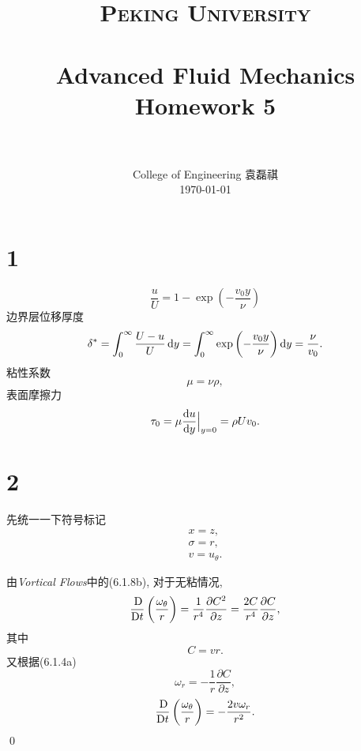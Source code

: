 \documentclass[12pt]{article}
\title{
		\vspace{-1in} 	
		\usefont{OT1}{bch}{b}{n}
		\normalfont \normalsize \textsc{\LARGE Peking University}\\[1cm] %
		\horrule{0.5pt} \\[0.5cm]
		\huge \bfseries{Advanced Fluid Mechanics Homework 5} \\
		\horrule{2pt} \\[0.5cm]
}
\author{
		\normalfont 								\normalsize
		College of Engineering \quad 2001111690  \quad 袁磊祺\\	\normalsize
        \today
}
\date{}
\begin{document}


\maketitle

\section{1}

\begin{equation}
	\frac{u}{U}=1-\exp \left(-\frac{v_{0} y}{\nu}\right)
\end{equation}
边界层位移厚度
\begin{equation}
	\delta^* = \int^{\infty}_0 \frac{U-u}{U} \dif y = \int^{\infty}_0 \exp \left(-\frac{v_{0} y}{\nu}\right) \dif y = \frac{\nu}{v_{0}}.
\end{equation}
粘性系数
\begin{equation}
	\mu = \nu \rho,
\end{equation}
表面摩擦力
\begin{equation}
	\tau_0 = \mu  \frac{\dif u}{\dif y}\Big|_{y=0} = \rho U v_0.
\end{equation}



\section{2}

先统一一下符号标记
\begin{gather}
	x = z,\\
	\sigma = r,\\
	v = u_\theta.
\end{gather}

由\emph{Vortical Flows}中的(6.1.8b), 对于无粘情况, 
\begin{equation}
	\frac{\Dif}{\Dif t}\left(\frac{\omega_{\theta}}{r}\right)=\frac{1}{r^{4}} \frac{\partial C^{2}}{\partial z}=\frac{2C}{r^{4}} \frac{\partial C}{\partial z},
\end{equation}
其中
\begin{equation}
	C = vr.
\end{equation}
又根据(6.1.4a)
\begin{equation}
	\omega_r = - \frac{1}{r} \frac{\partial C}{\partial z},
\end{equation}
\begin{equation}
	\frac{\Dif}{\Dif t}\left(\frac{\omega_{\theta}}{r}\right)=  -\frac{2v\omega_r}{r^2}.
\end{equation}\qed
\end{document}

